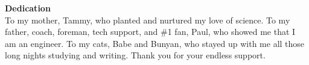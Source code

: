\hspace{0pt}\vfill
\centering\large\textbf{Dedication}\\
\normalsize\vspace{\baselineskip}
 To my mother, Tammy, who planted and nurtured my love of science. To my father, coach, foreman, tech support, and \#1 fan, Paul, who showed me that I am an engineer. To my cats, Babe and Bunyan, who stayed up with me all those long nights studying and writing. Thank you for your endless support.
\vfill\hspace{0pt}